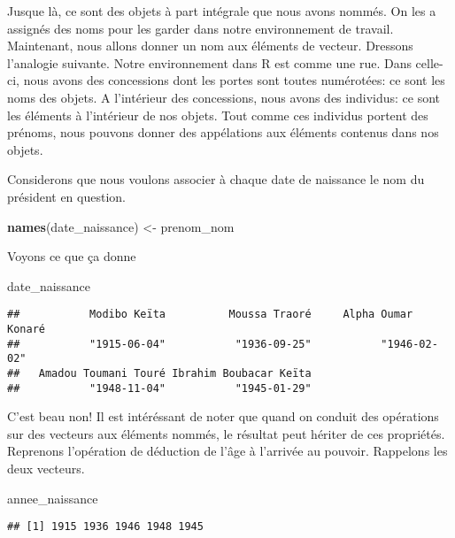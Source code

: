 \documentclass[]{book}
\newenvironment{Shaded}{\begin{snugshade}}{\end{snugshade}}
\newcommand{\KeywordTok}[1]{\textcolor[rgb]{0.13,0.29,0.53}{\textbf{#1}}}
\newcommand{\StringTok}[1]{\textcolor[rgb]{0.31,0.60,0.02}{#1}}
\newcommand{\NormalTok}[1]{#1}
\begin{document}
Jusque là, ce sont des objets à part intégrale que nous avons nommés. On
les a assignés des noms pour les garder dans notre environnement de
travail. Maintenant, nous allons donner un nom aux éléments de vecteur.
Dressons l'analogie suivante. Notre environnement dans R est comme une
rue. Dans celle-ci, nous avons des concessions dont les portes sont
toutes numérotées: ce sont les noms des objets. A l'intérieur des
concessions, nous avons des individus: ce sont les éléments à
l'intérieur de nos objets. Tout comme ces individus portent des prénoms,
nous pouvons donner des appélations aux éléments contenus dans nos
objets.

Considerons que nous voulons associer à chaque date de naissance le nom
du président en question.

\begin{Shaded}
\begin{Highlighting}[]
\KeywordTok{names}\NormalTok{(date_naissance) <-}\StringTok{ }\NormalTok{prenom_nom}
\end{Highlighting}
\end{Shaded}

Voyons ce que ça donne

\begin{Shaded}
\begin{Highlighting}[]
\NormalTok{date_naissance}
\end{Highlighting}
\end{Shaded}

\begin{verbatim}
##           Modibo Keïta          Moussa Traoré     Alpha Oumar Konaré 
##           "1915-06-04"           "1936-09-25"           "1946-02-02" 
##   Amadou Toumani Touré Ibrahim Boubacar Keïta 
##           "1948-11-04"           "1945-01-29"
\end{verbatim}

C'est beau non! Il est intéréssant de noter que quand on conduit des
opérations sur des vecteurs aux éléments nommés, le résultat peut
hériter de ces propriétés. Reprenons l'opération de déduction de l'âge à
l'arrivée au pouvoir. Rappelons les deux vecteurs.

\begin{Shaded}
\begin{Highlighting}[]
\NormalTok{annee_naissance}
\end{Highlighting}
\end{Shaded}

\begin{verbatim}
## [1] 1915 1936 1946 1948 1945
\end{verbatim}
\end{document}
